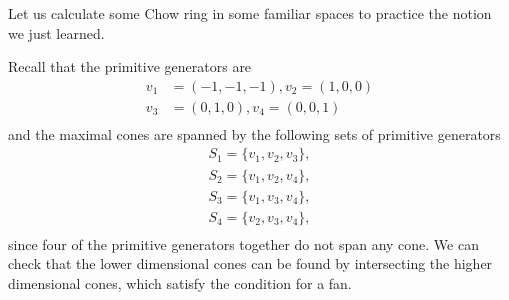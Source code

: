 Let us calculate some Chow ring in some familiar spaces to practice the notion we just learned. 
	\begin{example}
		Recall that the primitive generators are 
		\begin{align*}
		v_1 &= (-1, -1, -1), v_2 = (1, 0, 0) \\
		v_3 &= (0, 1, 0), v_4 = (0, 0, 1) \\
		\end{align*}
		and the maximal cones are spanned by the following 
		sets of primitive generators
		\begin{align*}
		S_1 = \{v_1, v_2, v_3\}, \\
		S_2 = \{v_1, v_2, v_4\}, \\
		S_3 = \{v_1, v_3, v_4\}, \\
		S_4 = \{v_2, v_3, v_4\}, \\
		\end{align*}
		since four of the primitive generators together 
		do not span any cone. 
		We can check that the lower dimensional cones 
		can be found by intersecting the higher dimensional cones,
		which satisfy the condition for a fan. 
		

\end{example}

